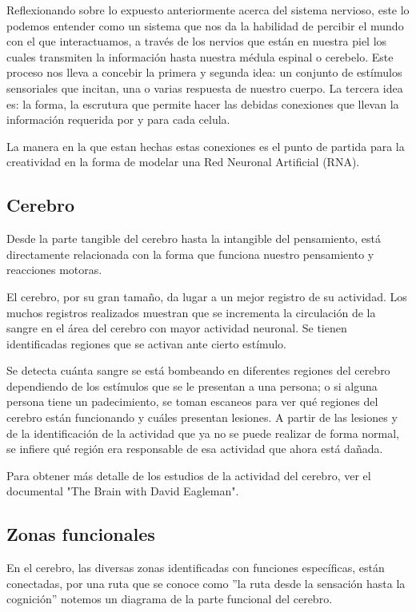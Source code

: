 Reflexionando sobre lo expuesto anteriormente acerca del sistema nervioso,
este lo podemos entender como un sistema que nos da la habilidad de percibir el mundo con el que interactuamos, a través de los nervios que están en nuestra piel los cuales transmiten la información hasta nuestra médula espinal o cerebelo. Este proceso nos lleva a concebir la primera y segunda idea: un conjunto de estímulos sensoriales que incitan, una o varias respuesta de nuestro cuerpo. La tercera idea es: la forma, la escrutura que permite hacer las debidas conexiones que llevan la información requerida por y para cada celula.

La manera en la que estan hechas estas conexiones es el punto de partida para la creatividad en la forma de modelar una Red Neuronal Artificial (RNA).

\subsection{Cerebro}

Desde la parte tangible del cerebro hasta la intangible del pensamiento, está directamente relacionada con la forma que funciona nuestro pensamiento y reacciones motoras.


El cerebro, por su gran tamaño, da lugar a un mejor registro de su actividad. Los muchos registros realizados muestran que se incrementa la circulación de la sangre en el área del cerebro con mayor actividad neuronal. Se tienen identificadas regiones que se activan ante cierto estímulo. \parencite{neurona_A_cerebro}


 Se detecta cuánta sangre se está bombeando en diferentes regiones del cerebro dependiendo de los estímulos que se le presentan a una persona; o si alguna persona tiene un padecimiento, se toman escaneos para ver qué regiones del cerebro están funcionando y cuáles presentan lesiones. A partir de las lesiones y de la identificación de la actividad que ya no se puede realizar de forma normal, se infiere qué región era responsable de esa actividad que ahora está dañada.\parencite{estudiosF}

Para obtener más detalle de los estudios de la actividad del cerebro, ver el documental "The Brain with David Eagleman".

\subsection{Zonas funcionales}

En el cerebro, las diversas zonas identificadas con funciones específicas, están conectadas, por una ruta que se conoce como 
 ''la ruta desde la sensación hasta la cognición'' notemos un diagrama de la parte funcional del cerebro. \parencite{sensAcogn}
 


